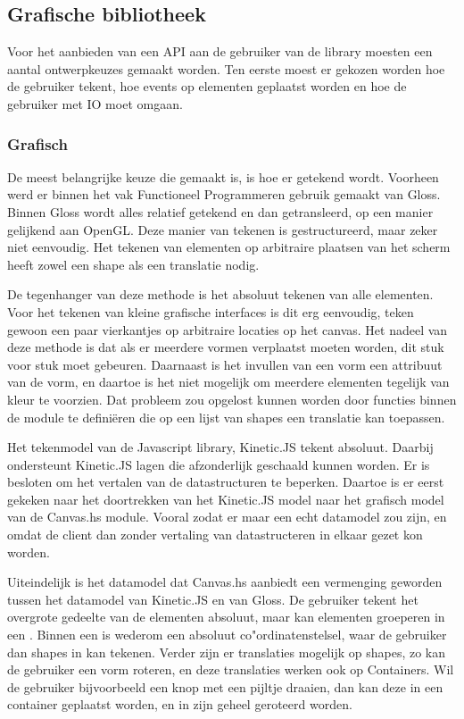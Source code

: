 \subsection{Grafische bibliotheek} \label{subsec:grafische_bibliotheek}

Voor het aanbieden van een API aan de gebruiker van de library moesten een aantal ontwerpkeuzes gemaakt worden. Ten eerste moest er gekozen worden hoe de gebruiker tekent, hoe events op elementen geplaatst worden en hoe de gebruiker met IO moet omgaan.

\subsubsection{Grafisch}
De meest belangrijke keuze die gemaakt is, is hoe er getekend wordt. Voorheen werd er binnen het vak Functioneel Programmeren gebruik gemaakt van Gloss. Binnen Gloss wordt alles relatief getekend en dan getransleerd, op een manier gelijkend aan OpenGL. Deze manier van tekenen is gestructureerd, maar zeker niet eenvoudig. Het tekenen van elementen op arbitraire plaatsen van het scherm heeft zowel een shape als een translatie nodig.

De tegenhanger van deze methode is het absoluut tekenen van alle elementen. Voor het tekenen van kleine grafische interfaces is dit erg eenvoudig, teken gewoon een paar vierkantjes op arbitraire locaties op het canvas. Het nadeel van deze methode is dat als er meerdere vormen verplaatst moeten worden, dit stuk voor stuk moet gebeuren. Daarnaast is het invullen van een vorm een attribuut van de vorm, en daartoe is het niet mogelijk om meerdere elementen tegelijk van kleur te voorzien. Dat probleem zou opgelost kunnen worden door functies binnen de module te defini\"eren die op een lijst van shapes een translatie kan toepassen.

Het tekenmodel van de Javascript library, Kinetic.JS tekent absoluut. Daarbij ondersteunt Kinetic.JS lagen die afzonderlijk geschaald kunnen worden. Er is besloten om het vertalen van de datastructuren te beperken. Daartoe is er eerst gekeken naar het doortrekken van het Kinetic.JS model naar het grafisch model van de Canvas.hs module. Vooral zodat er maar een echt datamodel zou zijn, en omdat de client dan zonder vertaling van datastructeren in elkaar gezet kon worden.

Uiteindelijk is het datamodel dat Canvas.hs aanbiedt een vermenging geworden tussen het datamodel van Kinetic.JS en van Gloss. De gebruiker tekent het overgrote gedeelte van de elementen absoluut, maar kan elementen groeperen in een . Binnen een  is wederom een absoluut co"ordinatenstelsel, waar de gebruiker dan shapes in kan tekenen. Verder zijn er translaties mogelijk op shapes, zo kan de gebruiker een vorm roteren, en deze translaties werken ook op Containers. Wil de gebruiker bijvoorbeeld een knop met een pijltje draaien, dan kan deze in een container geplaatst worden, en in zijn geheel geroteerd worden.

